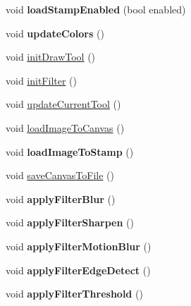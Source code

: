 \begin{DoxyCompactItemize}
\item 
\hypertarget{classFlashPhotoApp_a9e58a2c36d94fcbe376f3cb5b75ad5e0}{void {\bfseries load\-Stamp\-Enabled} (bool enabled)}\label{classFlashPhotoApp_a9e58a2c36d94fcbe376f3cb5b75ad5e0}

\item 
\hypertarget{classFlashPhotoApp_ad554624b8359abe270e5c6e76634ff48}{void {\bfseries update\-Colors} ()}\label{classFlashPhotoApp_ad554624b8359abe270e5c6e76634ff48}

\item 
void \hyperlink{classFlashPhotoApp_a29383606562f09ba623209581f92f5e5}{init\-Draw\-Tool} ()
\item 
void \hyperlink{classFlashPhotoApp_aeaf85d6ead6ca4b3905701db12ceaf68}{init\-Filter} ()
\item 
void \hyperlink{classFlashPhotoApp_a52eb2524a928df150d75492d96a3d49c}{update\-Current\-Tool} ()
\item 
void \hyperlink{classFlashPhotoApp_a7cc9f1383c18cb7eebc255d3c377adb0}{load\-Image\-To\-Canvas} ()
\item 
\hypertarget{classFlashPhotoApp_a87aee2ef5baef954b682c67e3d5118da}{void {\bfseries load\-Image\-To\-Stamp} ()}\label{classFlashPhotoApp_a87aee2ef5baef954b682c67e3d5118da}

\item 
void \hyperlink{classFlashPhotoApp_ab0389fb3c2c64e0e3312880e745b7070}{save\-Canvas\-To\-File} ()
\item 
\hypertarget{classFlashPhotoApp_a16ff3baa9c0d97d8e4f292acb4ebbfac}{void {\bfseries apply\-Filter\-Blur} ()}\label{classFlashPhotoApp_a16ff3baa9c0d97d8e4f292acb4ebbfac}

\item 
\hypertarget{classFlashPhotoApp_a9d45a9f24245024cba2c9090d7acb528}{void {\bfseries apply\-Filter\-Sharpen} ()}\label{classFlashPhotoApp_a9d45a9f24245024cba2c9090d7acb528}

\item 
\hypertarget{classFlashPhotoApp_af99c135d287d07e01ccd1637cba0d347}{void {\bfseries apply\-Filter\-Motion\-Blur} ()}\label{classFlashPhotoApp_af99c135d287d07e01ccd1637cba0d347}

\item 
\hypertarget{classFlashPhotoApp_ae7360d5fc26c2789d0126defb1c30e9f}{void {\bfseries apply\-Filter\-Edge\-Detect} ()}\label{classFlashPhotoApp_ae7360d5fc26c2789d0126defb1c30e9f}

\item 
\hypertarget{classFlashPhotoApp_a316479ee5fc48b785c266953147de63e}{void {\bfseries apply\-Filter\-Threshold} ()}\label{classFlashPhotoApp_a316479ee5fc48b785c266953147de63e}


\end{DoxyCompactItemize}
